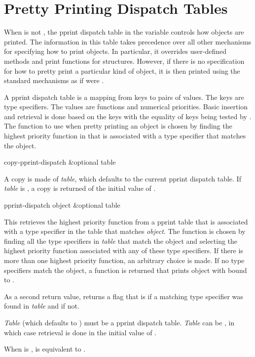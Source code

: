 \section{Pretty Printing Dispatch Tables}

When  is not , the pprint dispatch table in the variable
 controls how objects are printed.  The information
in this table takes precedence over all other mechanisms for specifying how
to print objects.  In particular, it overrides user-defined 
methods and print functions for structures.  However, if there is no
specification for how to pretty print a particular kind of object, it is then
printed using the standard mechanisms as if  were .

A pprint dispatch table is a mapping from keys to pairs of values.  The keys
are type specifiers.  The values are functions and numerical priorities.
Basic insertion and retrieval is done based on the keys with the equality
of keys being tested by .  The function to use when pretty printing an
object is chosen by finding the highest priority function in
 that is associated with a type specifier that
matches the object.

\begin{defun}[Function]
copy-pprint-dispatch &optional table 

A copy is made of \emph{table}, which defaults to the current pprint dispatch
table.  If \emph{table} is , a copy is returned of the initial value of
.
\end{defun}

\begin{defun}[Function]
pprint-dispatch object &optional table 

This retrieves the highest priority function from a pprint table that is
associated with a type specifier in the table that matches \emph{object}.
The function is chosen by finding all the type specifiers in \emph{table}
that match the object and selecting the highest priority function
associated with any of these type specifiers.  If there is more than one
highest priority function, an arbitrary choice is made.  If no type
specifiers match the object, a function is returned that prints object with
 bound to .

As a second return value,  returns a flag that is  if a
matching type specifier was found in \emph{table} and  if not.

\emph{Table} (which defaults to ) must be a
pprint dispatch table.  \emph{Table} can be , in which case
retrieval is done in the initial value of .

When  is ,  is equivalent to
.
\end{defun}

